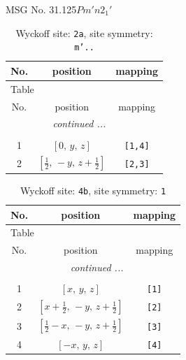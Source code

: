 \documentclass[fleqn,8pt]{jsarticle}
\begin{document}
\setcounter{MaxMatrixCols}{32}

\renewcommand{\tablename}{Table~}
\renewcommand{\figurename}{Figure~}
\begin{center}
\LARGE
MSG No. 31.125\quad$Pm'n2_{1}'$
\end{center}
\renewcommand{\arraystretch}{1.2}
\begin{longtable}{ccc}
\caption{Wyckoff site: {\tt 2a}, site symmetry: {\tt m'..}}
 \\
 \hline \hline
No. & position & mapping \\ \hline \endfirsthead

\multicolumn{2}{l}{\tablename\ \thetable{}} \\
 \hline \hline
No. & position & mapping \\ \hline \endhead

 \hline \hline
\multicolumn{2}{r}{\footnotesize\it continued ...} \\ \endfoot

 \hline \hline
\multicolumn{2}{r}{} \\ \endlastfoot

1 & $\left[ 0,\, y,\, z \right]$ & {\tt [1,4]} \\ \hline
2 & $\left[ \frac{1}{2},\, - y,\, z + \frac{1}{2} \right]$ & {\tt [2,3]} \\
\end{longtable}
\renewcommand{\arraystretch}{1.2}
\begin{longtable}{ccc}
\caption{Wyckoff site: {\tt 4b}, site symmetry: {\tt 1}}
 \\
 \hline \hline
No. & position & mapping \\ \hline \endfirsthead

\multicolumn{2}{l}{\tablename\ \thetable{}} \\
 \hline \hline
No. & position & mapping \\ \hline \endhead

 \hline \hline
\multicolumn{2}{r}{\footnotesize\it continued ...} \\ \endfoot

 \hline \hline
\multicolumn{2}{r}{} \\ \endlastfoot

1 & $\left[ x,\, y,\, z \right]$ & {\tt [1]} \\ \hline
2 & $\left[ x + \frac{1}{2},\, - y,\, z + \frac{1}{2} \right]$ & {\tt [2]} \\ \hline
3 & $\left[ \frac{1}{2} - x,\, - y,\, z + \frac{1}{2} \right]$ & {\tt [3]} \\ \hline
4 & $\left[ - x,\, y,\, z \right]$ & {\tt [4]} \\
\end{longtable}
\end{document}
